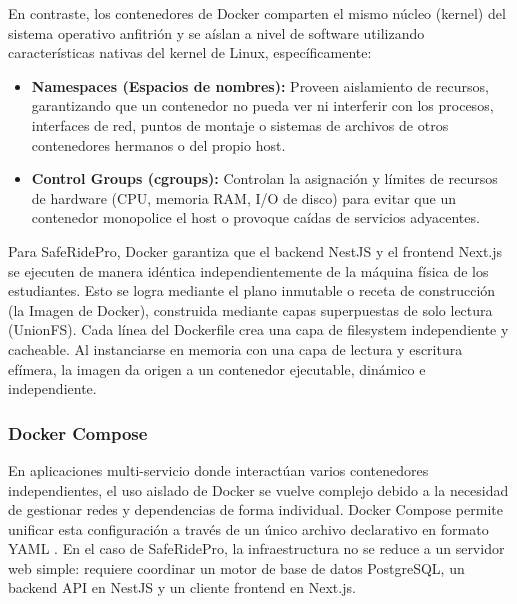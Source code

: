 \documentclass{article}
\begin{document}
En contraste, los contenedores de Docker comparten el mismo núcleo (kernel) del sistema operativo anfitrión y se aíslan a nivel de software utilizando características nativas del kernel de Linux, específicamente:
\begin{itemize}[leftmargin=*]
    \item \textbf{Namespaces (Espacios de nombres):} Proveen aislamiento de recursos, garantizando que un contenedor no pueda ver ni interferir con los procesos, interfaces de red, puntos de montaje o sistemas de archivos de otros contenedores hermanos o del propio host.
    \item \textbf{Control Groups (cgroups):} Controlan la asignación y límites de recursos de hardware (CPU, memoria RAM, I/O de disco) para evitar que un contenedor monopolice el host o provoque caídas de servicios adyacentes.
\end{itemize}

Para SafeRidePro, Docker garantiza que el backend NestJS y el frontend Next.js se ejecuten de manera idéntica independientemente de la máquina física de los estudiantes. Esto se logra mediante el plano inmutable o receta de construcción (la Imagen de Docker), construida mediante capas superpuestas de solo lectura (UnionFS). Cada línea del Dockerfile crea una capa de filesystem independiente y cacheable. Al instanciarse en memoria con una capa de lectura y escritura efímera, la imagen da origen a un contenedor ejecutable, dinámico e independiente.

\subsubsection*{Docker Compose}
En aplicaciones multi-servicio donde interactúan varios contenedores independientes, el uso aislado de Docker se vuelve complejo debido a la necesidad de gestionar redes y dependencias de forma individual. Docker Compose permite unificar esta configuración a través de un único archivo declarativo en formato YAML \cite{dockercompose}. En el caso de SafeRidePro, la infraestructura no se reduce a un servidor web simple: requiere coordinar un motor de base de datos PostgreSQL, un backend API en NestJS y un cliente frontend en Next.js.
\end{document}

